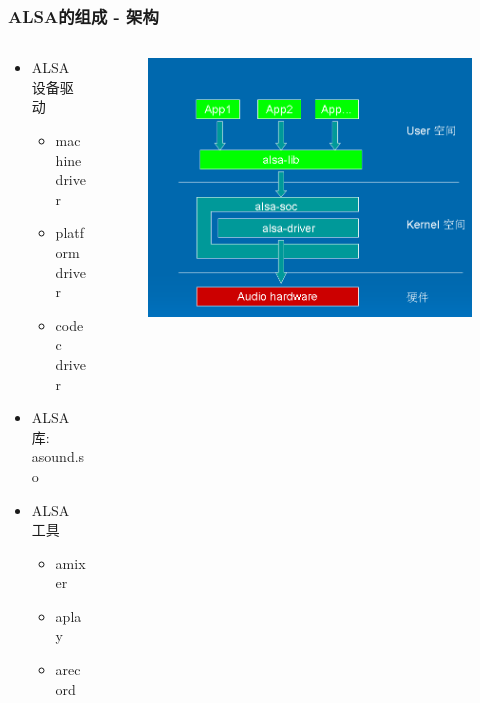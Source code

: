 \documentclass[CJK]{beamer}
\begin{document}
\begin{frame}
    \frametitle{ALSA的组成 - 架构}
    \begin{columns}
        \begin{column}{0.4\textwidth}
            \begin{itemize}
                \item ALSA 设备驱动
                    \begin{itemize}
                        \item machine driver
                        \item platform driver
                        \item codec driver
                    \end{itemize}
                \item ALSA 库: asound.so
                \item ALSA 工具
                    \begin{itemize}
                        \item amixer
                        \item aplay
                        \item arecord
                    \end{itemize}
            \end{itemize}
        \end{column}
        \begin{column}{0.5\textwidth}
            \begin{figure}
                \includegraphics[height=150bp]{"alsa_components_layer.png"}
            \end{figure}
        \end{column}
    \end{columns}
\end{frame}
\end{document}
